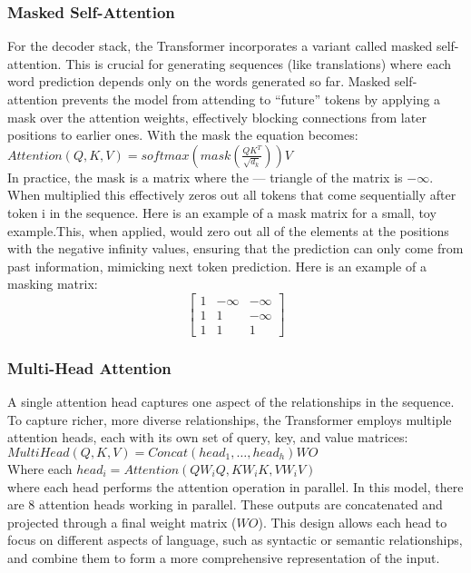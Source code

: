 \subsubsection{Masked Self-Attention}
For the decoder stack, the Transformer incorporates a variant called masked self-attention. This is crucial for generating sequences (like translations) where each word prediction depends only on the words generated so far. Masked self-attention prevents the model from attending to “future” tokens by applying a mask over the attention weights, effectively blocking connections from later positions to earlier ones. With the mask the equation becomes: \\
	\tab[1cm]$Attention(Q, K, V) = softmax(mask(\frac{QK^T}{\sqrt{d_k}}))V$ \\
In practice, the mask is a matrix where the — triangle of the matrix is $-\infty$. When multiplied this effectively zeros out all tokens that come sequentially after token i in the sequence. Here is an example of a mask matrix for a small, toy example.This, when applied, would zero out all of the elements at the positions with the negative infinity values, ensuring that the prediction can only come from past information, mimicking next token prediction. Here is an example of a masking matrix: 
    \[
\begin{bmatrix}
    1 & -\infty & -\infty \\
    1 & 1 & -\infty \\
    1 & 1 & 1
\end{bmatrix}
\]

\subsubsection{Multi-Head Attention}
A single attention head captures one aspect of the relationships in the sequence. To capture richer, more diverse relationships, the Transformer employs multiple attention heads, each with its own set of query, key, and value matrices:\\
	\tab$MultiHead(Q, K, V) = Concat(head_1,\dots,head_h)WO $ \\
	\tab Where each $head_i =Attention(QW_iQ,KW_iK, VW_iV) $ \\
where each head performs the attention operation in parallel. In this model, there are 8 attention heads working in parallel. These outputs are concatenated and projected through a final weight matrix ($WO$). This design allows each head to focus on different aspects of language, such as syntactic or semantic relationships, and combine them to form a more comprehensive representation of the input.

